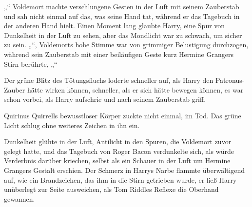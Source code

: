 „“
Voldemort machte verschlungene Gesten in der Luft mit seinem Zauberstab und sah nicht einmal auf das, was seine Hand tat, während er das Tagebuch in der anderen Hand hielt. Einen Moment lang glaubte Harry, eine Spur von Dunkelheit in der Luft zu sehen, aber das Mondlicht war zu schwach, um sicher zu sein.
„“, Voldemorts hohe Stimme war von grimmiger Belustigung durchzogen, während sein Zauberstab mit einer beiläufigen Geste kurz Hermine Grangers Stirn berührte, „“ 

Der grüne Blitz des Tötungsfluchs loderte schneller auf, als Harry den Patronus-Zauber hätte wirken können, schneller, als er sich hätte bewegen können, es war schon vorbei, als Harry aufschrie und nach seinem Zauberstab griff.

Quirinus Quirrells bewusstloser Körper zuckte nicht einmal, im Tod. Das grüne Licht schlug ohne weiteres Zeichen in ihn ein.

Dunkelheit glühte in der Luft, Antilicht in den Spuren, die Voldemort zuvor gelegt hatte, und das Tagebuch von Roger Bacon verdunkelte sich, als würde Verderbnis darüber kriechen, selbst als ein Schauer in der Luft um Hermine Grangers Gestalt erschien.
Der Schmerz in Harrys Narbe flammte überwältigend auf, wie ein Brandzeichen, das ihm in die Stirn getrieben wurde, er ließ Harry unüberlegt zur Seite ausweichen, als Tom Riddles Reflexe die Oberhand gewannen.

